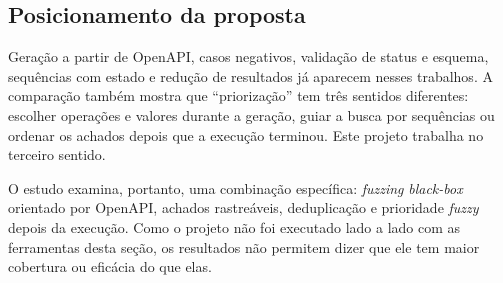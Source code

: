 \subsection{Posicionamento da proposta}

Geração a partir de OpenAPI, casos negativos, validação de status e esquema,
sequências com estado e redução de resultados já aparecem nesses trabalhos. A
comparação também mostra que ``priorização'' tem três sentidos diferentes:
escolher operações e valores durante a geração, guiar a busca por sequências
ou ordenar os achados depois que a execução terminou. Este projeto trabalha no
terceiro sentido.

O estudo examina, portanto, uma combinação específica: \textit{fuzzing}
\textit{black-box} orientado por OpenAPI, achados rastreáveis, deduplicação e
prioridade \textit{fuzzy} depois da execução. Como o projeto não foi executado
lado a lado com as ferramentas desta seção, os resultados não permitem dizer
que ele tem maior cobertura ou eficácia do que elas.

